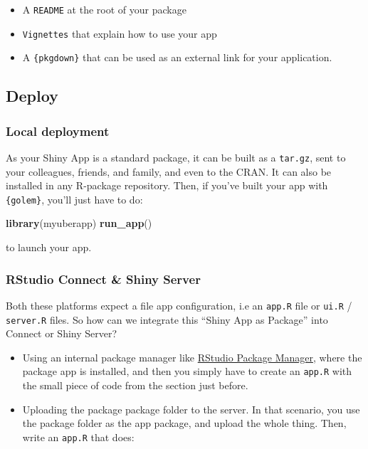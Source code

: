 \documentclass[]{book}
\newenvironment{Shaded}{\begin{snugshade}}{\end{snugshade}}
\newcommand{\KeywordTok}[1]{\textcolor[rgb]{0.13,0.29,0.53}{\textbf{#1}}}
\newcommand{\NormalTok}[1]{#1}
\providecommand{\tightlist}{%
  \setlength{\itemsep}{0pt}\setlength{\parskip}{0pt}}
\begin{document}
\begin{itemize}
\tightlist
\item
  A \texttt{README} at the root of your package
\item
  \texttt{Vignettes} that explain how to use your app
\item
  A \texttt{\{pkgdown\}} that can be used as an external link for your application.
\end{itemize}

\hypertarget{deploy}{%
\subsection{Deploy}\label{deploy}}

\hypertarget{local-deployment}{%
\subsubsection{Local deployment}\label{local-deployment}}

As your Shiny App is a standard package, it can be built as a \texttt{tar.gz}, sent to your colleagues, friends, and family, and even to the CRAN. It can also be installed in any R-package repository. Then, if you've built your app with \texttt{\{golem\}}, you'll just have to do:

\begin{Shaded}
\begin{Highlighting}[]
\KeywordTok{library}\NormalTok{(myuberapp)}
\KeywordTok{run_app}\NormalTok{()}
\end{Highlighting}
\end{Shaded}

to launch your app.

\hypertarget{rstudio-connect-shiny-server}{%
\subsubsection{RStudio Connect \& Shiny Server}\label{rstudio-connect-shiny-server}}

Both these platforms expect a file app configuration, i.e an \texttt{app.R} file or \texttt{ui.R} / \texttt{server.R} files. So how can we integrate this ``Shiny App as Package'' into Connect or Shiny Server?

\begin{itemize}
\item
  Using an internal package manager like \href{https://www.rstudio.com/products/package-manager/}{RStudio Package Manager}, where the package app is installed, and then you simply have to create an \texttt{app.R} with the small piece of code from the section just before.
\item
  Uploading the package package folder to the server. In that scenario, you use the package folder as the app package, and upload the whole thing. Then, write an \texttt{app.R} that does:
\end{itemize}
\end{document}
